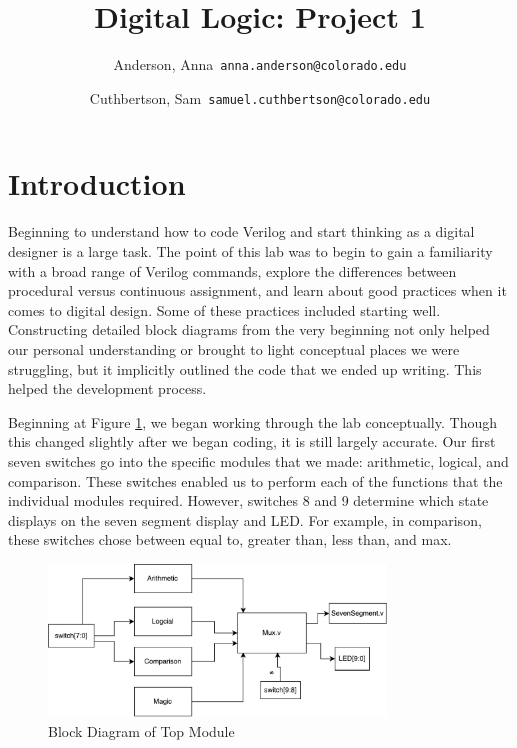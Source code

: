 \documentclass[11pt]{article}
\begin{document}
\author{
  Anderson, Anna\      \qquad\texttt{anna.anderson@colorado.edu}
  \and
  Cuthbertson, Sam\      \qquad\texttt{samuel.cuthbertson@colorado.edu}
  }

\title{Digital Logic: Project 1}
\maketitle


\newpage
\section{Introduction}

Beginning to understand how to code Verilog and start thinking as a digital designer is a large task. The point of this lab was to begin to gain a familiarity with a broad range of Verilog commands, explore the differences between procedural versus continuous assignment, and learn about good practices when it comes to digital design. Some of these practices included starting well. Constructing detailed block diagrams from the very beginning not only helped our personal understanding or brought to light conceptual places we were struggling, but it implicitly outlined the code that we ended up writing. This helped the development process.

Beginning at Figure \ref{fig:topdrawn}, we began working through the lab conceptually. Though this changed slightly after we began coding, it is still largely accurate. Our first seven switches go into the specific modules that we made: arithmetic, logical, and comparison. These switches enabled us to perform each of the functions that the individual modules required. However, switches 8 and 9 determine which state displays on the seven segment display and LED. For example, in comparison, these switches chose between equal to, greater than, less than, and max.

\begin{figure}[H]
    \centering
    \includegraphics[clip, width=0.8\textwidth]{Top_BD.pdf}
    \caption{Block Diagram of Top Module}
    \label{fig:topdrawn}
\end{figure}
\end{document}
